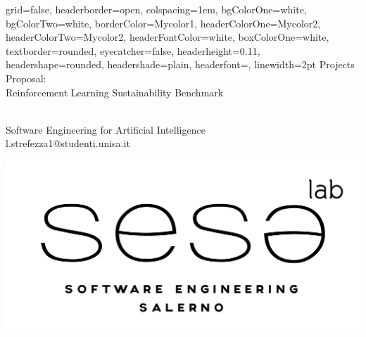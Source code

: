\documentclass[a0paper,portrait]{baposter}
\begin{document}

\begin{poster}
{
grid=false,
headerborder=open, %
colspacing=1em, %
bgColorOne=white, %
bgColorTwo=white, %
borderColor=Mycolor1, %
headerColorOne=Mycolor2, %
headerColorTwo=Mycolor2, %
headerFontColor=white, %
boxColorOne=white, %
textborder=rounded, %
eyecatcher=false, %
headerheight=0.11\textheight, %
headershape=rounded, %
headershade=plain,
headerfont=\Large\textsf, %
linewidth=2pt %
}
{}
%
%
{
\textsf %
{
{Projects Proposal: \\ \Large{Reinforcement Learning Sustainability Benchmark}}
}
} %
{\sf\vspace{0.2em}\\
Software Engineering for Artificial Intelligence\\  %
l.strefezza1@studenti.unisa.it  %

}
{\includegraphics[width=.25\linewidth]{figures/SeSaLab.png}}



\end{poster}
\end{document}
